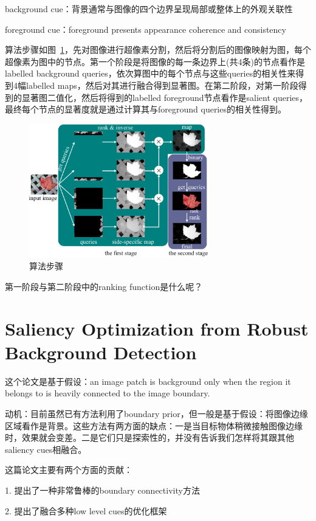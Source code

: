\documentclass[12pt]{article}
\begin{document}
background cue：背景通常与图像的四个边界呈现局部或整体上的外观关联性

foreground cue：foreground presents appearance coherence and consistency

算法步骤如图~\ref{fig: MR1}，先对图像进行超像素分割，然后将分割后的图像映射为图，每个超像素为图中的节点。第一个阶段是将图像的每一条边界上(共4条)的节点看作是labelled background queries，依次算图中的每个节点与这些queries的相关性来得到4幅labelled maps，然后对其进行融合得到显著图。在第二阶段，对第一阶段得到的显著图二值化，然后将得到的labelled foreground节点看作是salient queries，最终每个节点的显著度就是通过计算其与foreground queries的相关性得到。
\begin{figure}[!ht]
\centering
\includegraphics[width=0.7\textwidth]{MR1.png}
\caption{算法步骤}
\label{fig: MR1}
\end{figure}

第一阶段与第二阶段中的ranking function是什么呢？

\section{Saliency Optimization from Robust Background Detection}

这个论文是基于假设：an image patch is background only when the region it belongs to is heavily connected to the image boundary.

动机：目前虽然已有方法利用了boundary prior，但一般是基于假设：将图像边缘区域看作是背景。这些方法有两方面的缺点：一是当目标物体稍微接触图像边缘时，效果就会变差。二是它们只是探索性的，并没有告诉我们怎样将其跟其他saliency cues相融合。

这篇论文主要有两个方面的贡献：

1. 提出了一种非常鲁棒的boundary connectivity方法

2. 提出了融合多种low level cues的优化框架
\end{document}
